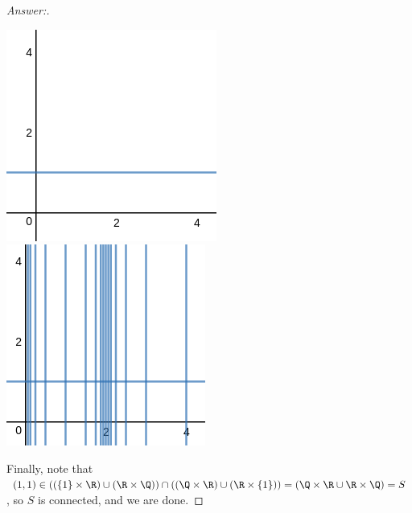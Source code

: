 \documentclass[letterpaper]{article}
\begin{document}
\begin{enumerate}
\begin{enumerate}
\begin{proof}[Answer:]
	\begin{center}
	\includegraphics[scale=.3]{hw10_prob1c_3}
	\quad
	\includegraphics[scale=.3]{hw10_prob1c_4}
	\end{center}
	 
	 Finally, note that $(1,1)\in ((\{1\}\times\R) \cup (\R\times\Q)) \cap ((\Q\times\R) \cup (\R\times\{1\})) = \left(\Q\times\R\cup \R\times\Q \right)=S$, so $S$ is connected, and we are done. 
	 

\end{proof}
\end{enumerate}
\end{enumerate}
\end{document}
